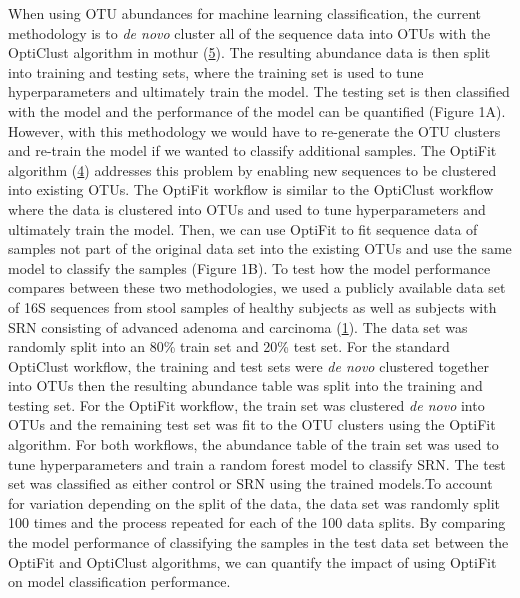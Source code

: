 \documentclass[
]{article}
\begin{document}
When using OTU abundances for machine learning classification, the
current methodology is to \emph{de novo} cluster all of the sequence
data into OTUs with the OptiClust algorithm in mothur
(\protect\hyperlink{ref-westcott2017}{5}). The resulting abundance data
is then split into training and testing sets, where the training set is
used to tune hyperparameters and ultimately train the model. The testing
set is then classified with the model and the performance of the model
can be quantified (Figure 1A). However, with this methodology we would
have to re-generate the OTU clusters and re-train the model if we wanted
to classify additional samples. The OptiFit algorithm
(\protect\hyperlink{ref-sovacool2022}{4}) addresses this problem by
enabling new sequences to be clustered into existing OTUs. The OptiFit
workflow is similar to the OptiClust workflow where the data is
clustered into OTUs and used to tune hyperparameters and ultimately
train the model. Then, we can use OptiFit to fit sequence data of
samples not part of the original data set into the existing OTUs and use
the same model to classify the samples (Figure 1B). To test how the
model performance compares between these two methodologies, we used a
publicly available data set of 16S sequences from stool samples of
healthy subjects as well as subjects with SRN consisting of advanced
adenoma and carcinoma (\protect\hyperlink{ref-baxter2016}{1}). The data
set was randomly split into an 80\% train set and 20\% test set. For the
standard OptiClust workflow, the training and test sets were \emph{de
novo} clustered together into OTUs then the resulting abundance table
was split into the training and testing set. For the OptiFit workflow,
the train set was clustered \emph{de novo} into OTUs and the remaining
test set was fit to the OTU clusters using the OptiFit algorithm. For
both workflows, the abundance table of the train set was used to tune
hyperparameters and train a random forest model to classify SRN. The
test set was classified as either control or SRN using the trained
models.To account for variation depending on the split of the data, the
data set was randomly split 100 times and the process repeated for each
of the 100 data splits. By comparing the model performance of
classifying the samples in the test data set between the OptiFit and
OptiClust algorithms, we can quantify the impact of using OptiFit on
model classification performance.
\end{document}
